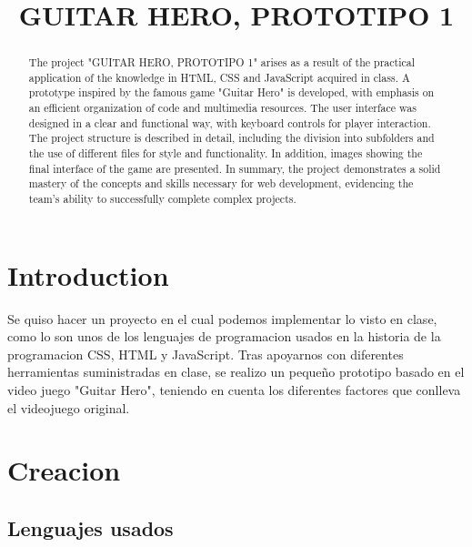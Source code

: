 \documentclass[conference]{IEEEtran}
\title{GUITAR HERO, PROTOTIPO 1}
\author{
\IEEEauthorblockN{Ángel Thomas Rodríguez Pinto - 506221014\\ angelt.rodriguezp@konradlorenz.edu.co}
\and
\IEEEauthorblockN{Eddy Andrés Díaz Santos - 506221024\\ eddya.diazs@konradlorenz.edu.co}
}
\begin{document}
\maketitle

\begin{abstract}

The project "GUITAR HERO, PROTOTIPO 1" arises as a result of the practical application of the knowledge in HTML, CSS and JavaScript acquired in class. A prototype inspired by the famous game "Guitar Hero" is developed, with emphasis on an efficient organization of code and multimedia resources. The user interface was designed in a clear and functional way, with keyboard controls for player interaction. The project structure is described in detail, including the division into subfolders and the use of different files for style and functionality. In addition, images showing the final interface of the game are presented. In summary, the project demonstrates a solid mastery of the concepts and skills necessary for web development, evidencing the team's ability to successfully complete complex projects.

\end{abstract}

\section{Introduction}

Se quiso hacer un proyecto en el cual podemos implementar lo visto en clase, como lo son unos de los lenguajes de programacion usados en la historia de la programacion CSS, HTML y JavaScript.
Tras apoyarnos con diferentes herramientas suministradas en clase, se realizo un pequeño prototipo basado en el video juego "Guitar Hero", teniendo en cuenta los diferentes factores que conlleva el videojuego original. 

\section{Creacion}

\subsection{Lenguajes usados}
\end{document}
